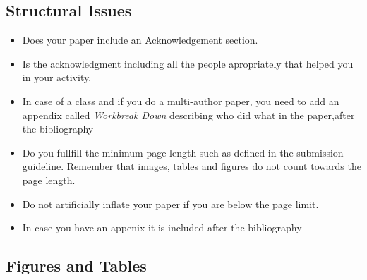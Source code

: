 \subsection{Structural Issues}

\begin{itemize}[label=$\Box$]
    \item Does your paper include an Acknowledgement section.
    \item Is the acknowledgment including all the people apropriately
      that helped you in your activity. 
    \item In case of a class and if you do a multi-author paper, you
      need to add an appendix called {\em Workbreak Down} describing
      who did what in the paper,after the bibliography
    \item Do you fullfill the minimum page length such as defined in
      the submission guideline. Remember that 
      images, tables and figures do not count towards the page length.
    \item Do not artificially inflate your paper if you are below the
      page limit.
    \item In case you have an appenix it is included after the
      bibliography
\end{itemize}

\subsection{Figures and Tables}

